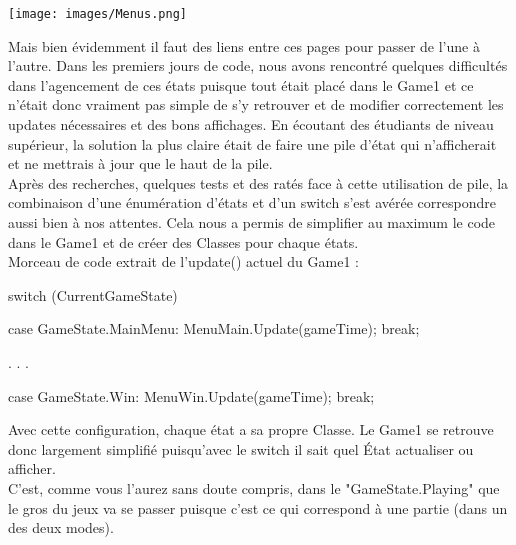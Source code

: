 \documentclass [11pt]{report}
\begin{document}
		\begin{center}
			\texttt{[image: images/Menus.png]}
		\end{center}
		
		
		\vspace{10mm}
			 
			 
		
		Mais bien évidemment il faut des liens entre ces pages pour passer de l'une à l'autre. Dans les premiers jours de code, nous avons rencontré quelques difficultés dans l'agencement de ces états puisque tout était placé dans le Game1 et ce n'était donc vraiment pas simple de s'y retrouver et de modifier correctement les updates nécessaires et des bons affichages. En écoutant des étudiants de niveau supérieur, la solution la plus claire était de faire une pile d'état qui n'afficherait et ne mettrais à jour que le haut de la pile.\\
		
		Après des recherches, quelques tests et des ratés face à cette utilisation de pile, la combinaison d'une énumération d'états et d'un switch s'est avérée correspondre aussi bien à nos attentes. Cela nous a permis de simplifier au maximum le code dans le Game1 et de créer des Classes pour chaque états.\\
				
		\noindent Morceau de code extrait de l'update() actuel du Game1 :
		
		
		\begin{mylisting}
	switch (CurrentGameState)
	{
		case GameState.MainMenu:
			MenuMain.Update(gameTime);
			break;
			
			.
			.
			.
			
		case GameState.Win:
			MenuWin.Update(gameTime);
			break;
	}
				\end{mylisting}
		
		\vspace{10mm}
		
		Avec cette configuration, chaque état a sa propre Classe. Le Game1 se retrouve donc largement simplifié puisqu'avec le switch il sait quel État actualiser ou afficher.\\
		
			
		C'est, comme vous l'aurez sans doute compris, dans le "GameState.Playing" que le gros du jeux va se passer puisque c'est ce qui correspond à une partie (dans un des deux modes).
		
		
		\vspace{10mm}
		\newpage
		
		
		
\end{document}
